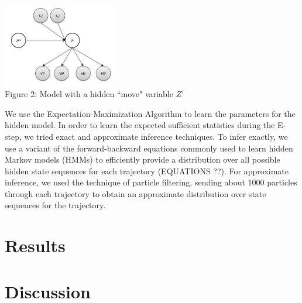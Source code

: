 \documentclass{article} %
\begin{document}
\includegraphics[width=5cm]{hidden.jpg}\\
\small{Figure 2: Model with a hidden ``move" variable $Z^\tau$}

We use the Expectation-Maximization Algorithm to learn the parameters for the hidden model. In order to learn the expected sufficient statistics during the E-step, we tried exact and approximate inference techniques. To infer exactly, we use a variant of the forward-backward equations commonly used to learn hidden Markov models (HMMs) to efficiently provide a distribution over all possible hidden state sequences for each trajectory (EQUATIONS ??). For approximate inference, we used the technique of particle filtering, sending about 1000 particles through each trajectory to obtain an approximate distribution over state sequences for the trajectory.

\section{Results}


\section{Discussion}
\end{document}
